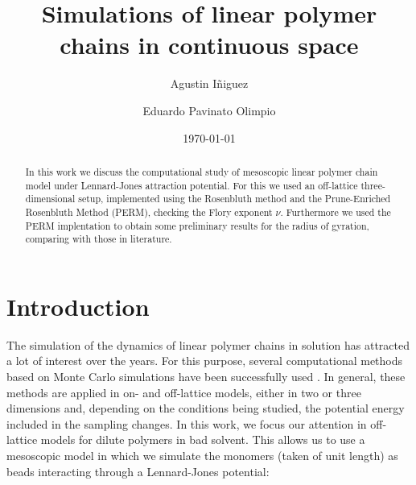 \documentclass[aps,prl,reprint,groupedaddress]{revtex4-1}
\begin{document}
\title{Simulations of linear polymer chains in continuous space}

\author{Agustin I\~niguez}
\author{Eduardo Pavinato Olimpio}


\date{\today}

\begin{abstract}
	In this work we discuss the computational study of mesoscopic linear polymer chain model under Lennard-Jones attraction potential. For this we used an off-lattice three-dimensional setup, implemented using the Rosenbluth method and the Prune-Enriched Rosenbluth Method (PERM), checking the Flory exponent $\nu$. Furthermore we used the PERM implentation to obtain some preliminary results for the radius of gyration, comparing with those in literature.
\end{abstract}

\maketitle

\section{Introduction}
The simulation of the dynamics of linear polymer chains in solution has attracted a lot of interest over the years. For this purpose, several computational methods based on Monte Carlo simulations have been successfully used \cite{mc_polymer_review}. In general, these methods are applied in on- and off-lattice models, either in two or three dimensions and, depending on the conditions being studied, the potential energy included in the sampling changes. In this work, we focus our attention in off-lattice models for dilute polymers in bad solvent. This allows us to use a mesoscopic model in which we simulate the monomers (taken of unit length) as beads interacting through a Lennard-Jones potential:
\end{document}
